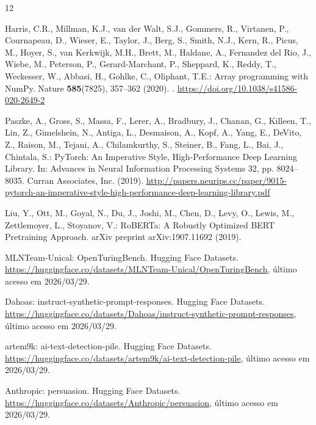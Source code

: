 \documentclass[runningheads]{llncs}
\begin{document}
%
%
%
% 
% 
%
\begin{thebibliography}{12}

Harris, C.R., Millman, K.J., van der Walt, S.J., Gommers, R., Virtanen, P., Cournapeau, D., Wieser, E., Taylor, J., Berg, S., Smith, N.J., Kern, R., Picus, M., Hoyer, S., van Kerkwijk, M.H., Brett, M., Haldane, A., Fernandez del Rio, J., Wiebe, M., Peterson, P., Gerard-Marchant, P., Sheppard, K., Reddy, T., Weckesser, W., Abbasi, H., Gohlke, C., Oliphant, T.E.: Array programming with NumPy. Nature \textbf{585}(7825), 357--362 (2020). . \url{https://doi.org/10.1038/s41586-020-2649-2}

Paszke, A., Gross, S., Massa, F., Lerer, A., Bradbury, J., Chanan, G., Killeen, T., Lin, Z., Gimelshein, N., Antiga, L., Desmaison, A., Kopf, A., Yang, E., DeVito, Z., Raison, M., Tejani, A., Chilamkurthy, S., Steiner, B., Fang, L., Bai, J., Chintala, S.: PyTorch: An Imperative Style, High-Performance Deep Learning Library. In: Advances in Neural Information Processing Systems 32, pp. 8024--8035. Curran Associates, Inc. (2019). \url{http://papers.neurips.cc/paper/9015-pytorch-an-imperative-style-high-performance-deep-learning-library.pdf}

Liu, Y., Ott, M., Goyal, N., Du, J., Joshi, M., Chen, D., Levy, O., Lewis, M., Zettlemoyer, L., Stoyanov, V.: RoBERTa: A Robustly Optimized BERT Pretraining Approach. arXiv preprint arXiv:1907.11692 (2019). 

MLNTeam-Unical: OpenTuringBench. Hugging Face Datasets.
\url{https://huggingface.co/datasets/MLNTeam-Unical/OpenTuringBench},
último acesso em 2026/03/29.

Dahoas: instruct-synthetic-prompt-responses. Hugging Face Datasets.
\url{https://huggingface.co/datasets/Dahoas/instruct-synthetic-prompt-responses},
último acesso em 2026/03/29.

artem9k: ai-text-detection-pile. Hugging Face Datasets.
\url{https://huggingface.co/datasets/artem9k/ai-text-detection-pile},
último acesso em 2026/03/29.

Anthropic: persuasion. Hugging Face Datasets.
\url{https://huggingface.co/datasets/Anthropic/persuasion},
último acesso em 2026/03/29.
\end{thebibliography}
\end{document}
